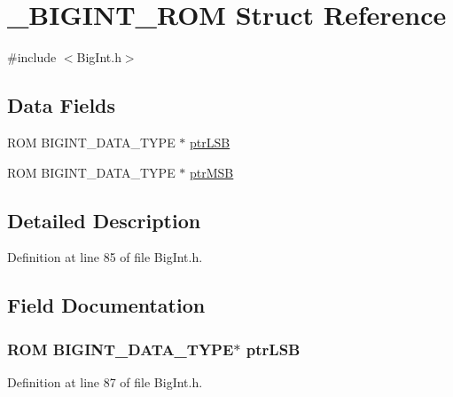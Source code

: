\hypertarget{struct___b_i_g_i_n_t___r_o_m}{}\section{\+\_\+\+B\+I\+G\+I\+N\+T\+\_\+\+R\+O\+M Struct Reference}
\label{struct___b_i_g_i_n_t___r_o_m}


{\ttfamily \#include $<$Big\+Int.\+h$>$}

\subsection*{Data Fields}
\begin{DoxyCompactItemize}
\item 
R\+O\+M B\+I\+G\+I\+N\+T\+\_\+\+D\+A\+T\+A\+\_\+\+T\+Y\+P\+E $\ast$ \hyperlink{struct___b_i_g_i_n_t___r_o_m_a0a27518f5c96ad779a442c1eee95fc53}{ptr\+L\+S\+B}
\item 
R\+O\+M B\+I\+G\+I\+N\+T\+\_\+\+D\+A\+T\+A\+\_\+\+T\+Y\+P\+E $\ast$ \hyperlink{struct___b_i_g_i_n_t___r_o_m_a6daa582d26fde2f1ab0c854fee432324}{ptr\+M\+S\+B}
\end{DoxyCompactItemize}


\subsection{Detailed Description}


Definition at line 85 of file Big\+Int.\+h.



\subsection{Field Documentation}
\hypertarget{struct___b_i_g_i_n_t___r_o_m_a0a27518f5c96ad779a442c1eee95fc53}{}
\subsubsection[{ptr\+L\+S\+B}]{\setlength{\rightskip}{0pt plus 5cm}R\+O\+M B\+I\+G\+I\+N\+T\+\_\+\+D\+A\+T\+A\+\_\+\+T\+Y\+P\+E$\ast$ ptr\+L\+S\+B}\label{struct___b_i_g_i_n_t___r_o_m_a0a27518f5c96ad779a442c1eee95fc53}


Definition at line 87 of file Big\+Int.\+h.

